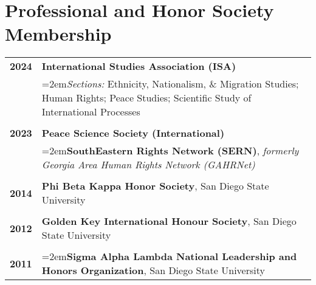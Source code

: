 \documentclass[letterpaper,12pt]{article}
\begin{document}
\section{Professional and Honor Society Membership}
\begin{xltabular}{\dimexpr\textwidth-0in}{p{.85in}X}
\textbf{2024} &  \textbf{International Studies Association (ISA)}\\
                     &  \hangindent=2em\textit{Sections:} Ethnicity, Nationalism, \& Migration Studies; Human Rights; Peace Studies; \mbox{Scientific} Study of International Processes\\ \\
\textbf{2023} &  \textbf{Peace Science Society (International)}\\
                     & \hangindent=2em\textbf{SouthEastern Rights Network (SERN)}, \textit{formerly Georgia Area Human Rights Network (GAHRNet)}\\ \\
\textbf{2014} &  \textbf{Phi Beta Kappa Honor Society}, San Diego State University\\ \\
\textbf{2012} &  \textbf{Golden Key International Honour Society}, San Diego State University\\ \\
\textbf{2011} &  \hangindent=2em\textbf{Sigma Alpha Lambda National Leadership and Honors Organization}, San Diego State University
\end{xltabular}

%

\end{document}
